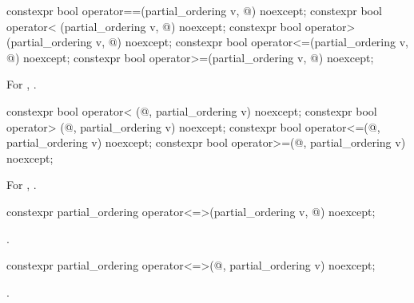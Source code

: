 %
%
%
%
%
\begin{itemdecl}
constexpr bool operator==(partial_ordering v, @\unspec@) noexcept;
constexpr bool operator< (partial_ordering v, @\unspec@) noexcept;
constexpr bool operator> (partial_ordering v, @\unspec@) noexcept;
constexpr bool operator<=(partial_ordering v, @\unspec@) noexcept;
constexpr bool operator>=(partial_ordering v, @\unspec@) noexcept;
\end{itemdecl}

\begin{itemdescr}
\pnum
\returns
For , .
\end{itemdescr}

%
%
%
%
\begin{itemdecl}
constexpr bool operator< (@\unspec@, partial_ordering v) noexcept;
constexpr bool operator> (@\unspec@, partial_ordering v) noexcept;
constexpr bool operator<=(@\unspec@, partial_ordering v) noexcept;
constexpr bool operator>=(@\unspec@, partial_ordering v) noexcept;
\end{itemdecl}

\begin{itemdescr}
\pnum
\returns
For , .
\end{itemdescr}

%
\begin{itemdecl}
constexpr partial_ordering operator<=>(partial_ordering v, @\unspec@) noexcept;
\end{itemdecl}

\begin{itemdescr}
\pnum
\returns
{}.
\end{itemdescr}

%
\begin{itemdecl}
constexpr partial_ordering operator<=>(@\unspec@, partial_ordering v) noexcept;
\end{itemdecl}

\begin{itemdescr}
\pnum
\returns
{}.
\end{itemdescr}

